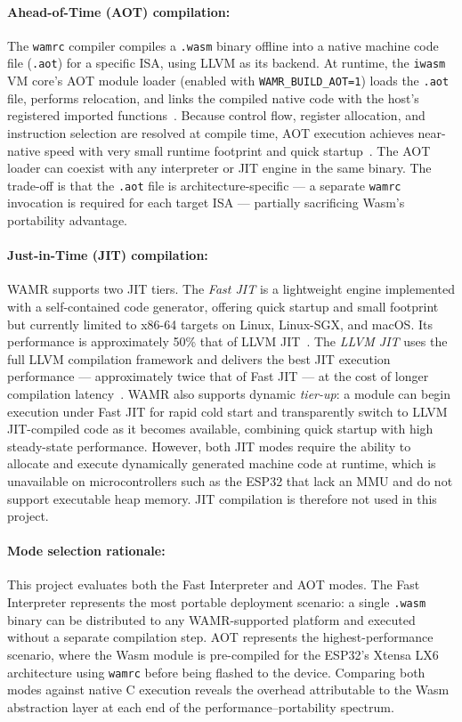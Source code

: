 \documentclass[12pt, a4paper]{report}
\begin{document}
\paragraph{Ahead-of-Time (AOT) compilation:} The \texttt{wamrc} compiler compiles a
\texttt{.wasm} binary offline into a native machine code file (\texttt{.aot}) for a
specific ISA, using LLVM as its backend. At runtime, the \texttt{iwasm} VM core's AOT
module loader (enabled with \texttt{WAMR\_BUILD\_AOT=1}) loads the \texttt{.aot} file,
performs relocation, and links the compiled native code with the host's registered imported
functions~\cite{wamr-running-modes-blog}. Because control flow, register allocation, and
instruction selection are resolved at compile time, AOT execution achieves near-native speed
with very small runtime footprint and quick startup~\cite{wamr-running-modes-doc}. The AOT
loader can coexist with any interpreter or JIT engine in the same binary. The trade-off is
that the \texttt{.aot} file is architecture-specific --- a separate \texttt{wamrc}
invocation is required for each target ISA --- partially sacrificing Wasm's portability
advantage.

\paragraph{Just-in-Time (JIT) compilation:} WAMR supports two JIT tiers. The \textit{Fast
JIT} is a lightweight engine implemented with a self-contained code generator, offering
quick startup and small footprint but currently limited to x86-64 targets on Linux,
Linux-SGX, and macOS. Its performance is approximately 50\% that of LLVM
JIT~\cite{wamr-running-modes-doc}. The \textit{LLVM JIT} uses the full LLVM compilation
framework and delivers the best JIT execution performance --- approximately twice that of
Fast JIT --- at the cost of longer compilation latency~\cite{wamr-running-modes-blog}. WAMR
also supports dynamic \textit{tier-up}: a module can begin execution under Fast JIT for
rapid cold start and transparently switch to LLVM JIT-compiled code as it becomes available,
combining quick startup with high steady-state performance. However, both JIT modes require
the ability to allocate and execute dynamically generated machine code at runtime, which is
unavailable on microcontrollers such as the ESP32 that lack an MMU and do not support
executable heap memory. JIT compilation is therefore not used in this project.

\paragraph{Mode selection rationale:} This project evaluates both the Fast Interpreter and
AOT modes. The Fast Interpreter represents the most portable deployment scenario: a single
\texttt{.wasm} binary can be distributed to any WAMR-supported platform and executed
without a separate compilation step. AOT represents the highest-performance scenario, where
the Wasm module is pre-compiled for the ESP32's Xtensa LX6 architecture using
\texttt{wamrc} before being flashed to the device. Comparing both modes against native C
execution reveals the overhead attributable to the Wasm abstraction layer at each end of the
performance--portability spectrum.
\end{document}
